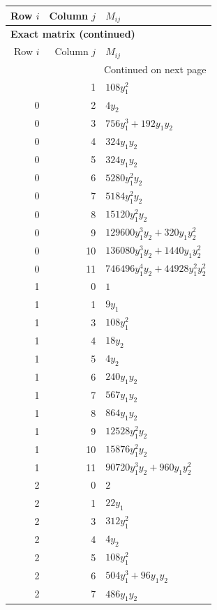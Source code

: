 \documentclass[10pt,a4paper]{article}
\begin{document}
{\small\setlength{\tabcolsep}{7pt}\begin{longtable}{rrp{125mm}}
\toprule Row $i$ & Column $j$ & $M_{ij}$\\\midrule\endfirsthead
\multicolumn{3}{l}{\textbf{Exact matrix (continued)}}\\
\toprule Row $i$ & Column $j$ & $M_{ij}$\\\midrule\endhead
\midrule\multicolumn{3}{r}{Continued on next page}\\\endfoot\bottomrule\endlastfoot
0 & 1 & $108 y_{1}^{2}$\\
0 & 2 & $4 y_{2}$\\
0 & 3 & $756 y_{1}^{3} + 192 y_{1} y_{2}$\\
0 & 4 & $324 y_{1} y_{2}$\\
0 & 5 & $324 y_{1} y_{2}$\\
0 & 6 & $5280 y_{1}^{2} y_{2}$\\
0 & 7 & $5184 y_{1}^{2} y_{2}$\\
0 & 8 & $15120 y_{1}^{2} y_{2}$\\
0 & 9 & $129600 y_{1}^{3} y_{2} + 320 y_{1} y_{2}^{2}$\\
0 & 10 & $136080 y_{1}^{3} y_{2} + 1440 y_{1} y_{2}^{2}$\\
0 & 11 & $746496 y_{1}^{4} y_{2} + 44928 y_{1}^{2} y_{2}^{2}$\\
1 & 0 & $1$\\
1 & 1 & $9 y_{1}$\\
1 & 3 & $108 y_{1}^{2}$\\
1 & 4 & $18 y_{2}$\\
1 & 5 & $4 y_{2}$\\
1 & 6 & $240 y_{1} y_{2}$\\
1 & 7 & $567 y_{1} y_{2}$\\
1 & 8 & $864 y_{1} y_{2}$\\
1 & 9 & $12528 y_{1}^{2} y_{2}$\\
1 & 10 & $15876 y_{1}^{2} y_{2}$\\
1 & 11 & $90720 y_{1}^{3} y_{2} + 960 y_{1} y_{2}^{2}$\\
2 & 0 & $2$\\
2 & 1 & $22 y_{1}$\\
2 & 3 & $312 y_{1}^{2}$\\
2 & 4 & $4 y_{2}$\\
2 & 5 & $108 y_{1}^{2}$\\
2 & 6 & $504 y_{1}^{3} + 96 y_{1} y_{2}$\\
2 & 7 & $486 y_{1} y_{2}$\\

\end{longtable}}
\end{document}
